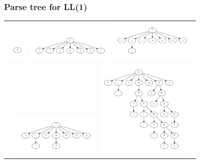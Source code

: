 \documentclass{article}
\begin{document}
\subsubsection{Parse tree for LL(1)}
\begin{tabular}{c}
\includegraphics[width=40px]{LL1-ParseTree/1.pdf}
\includegraphics[width=160px]{LL1-ParseTree/2.pdf}
\includegraphics[width=160px]{LL1-ParseTree/3.pdf}\\
\includegraphics[width=160px]{LL1-ParseTree/4.pdf}
\includegraphics[width=170px]{LL1-ParseTree/LL1-parse-tree.pdf}
\end{tabular}
\end{document}
